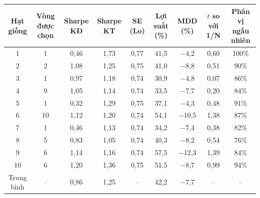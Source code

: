 \begin{tabular}{@{}ccccccccc@{}}
\toprule
Hạt giống & Vòng được chọn & Sharpe KĐ & Sharpe KT & SE (Lo) & Lợi suất (\%) & MDD (\%) & $t$ so với 1/N & Phân vị ngẫu nhiên \\
\midrule
1 & 1 & 0{,}46 & 1{,}73 & 0{,}77 & 41{,}5 & $-$4{,}2 & 0{,}60 & 100\% \\
2 & 2 & 1{,}08 & 1{,}25 & 0{,}75 & 41{,}0 & $-$8{,}8 & 0{,}51 & 90\% \\
3 & 1 & 0{,}97 & 1{,}18 & 0{,}74 & 30{,}9 & $-$4{,}8 & 0{,}07 & 86\% \\
4 & 9 & 1{,}05 & 1{,}14 & 0{,}74 & 33{,}5 & $-$7{,}7 & 0{,}20 & 84\% \\
5 & 1 & 0{,}32 & 1{,}29 & 0{,}75 & 37{,}1 & $-$4{,}3 & 0{,}48 & 91\% \\
6 & 10 & 1{,}12 & 1{,}20 & 0{,}74 & 54{,}1 & $-$10{,}5 & 1{,}38 & 87\% \\
7 & 1 & 0{,}46 & 1{,}13 & 0{,}74 & 34{,}2 & $-$7{,}4 & 0{,}38 & 82\% \\
8 & 5 & 0{,}83 & 1{,}05 & 0{,}74 & 40{,}3 & $-$8{,}2 & 0{,}54 & 76\% \\
9 & 6 & 1{,}14 & 1{,}16 & 0{,}74 & 57{,}5 & $-$12{,}3 & 1{,}39 & 84\% \\
10 & 6 & 1{,}20 & 1{,}36 & 0{,}75 & 51{,}5 & $-$8{,}7 & 0{,}99 & 94\% \\
\midrule
Trung bình & -- & 0{,}86 & 1{,}25 & -- & 42{,}2 & $-$7{,}7 & -- & -- \\
\bottomrule
\end{tabular}
